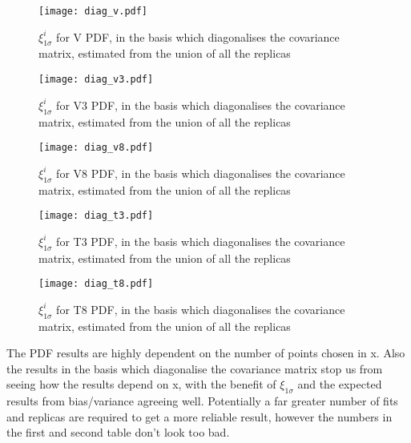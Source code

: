 \begin{figure}
    \centering
    \texttt{[image: diag\_v.pdf]}
    \caption{
        $\xi^{i}_{1\sigma}$ for V PDF, in the basis which diagonalises
        the covariance matrix, estimated from the union of all the replicas
    }
    \label{fig:pdfdiagv}
\end{figure}

\begin{figure}
    \centering
    \texttt{[image: diag\_v3.pdf]}
    \caption{
        $\xi^{i}_{1\sigma}$ for V3 PDF, in the basis which diagonalises
        the covariance matrix, estimated from the union of all the replicas
    }
    \label{fig:pdfdiagv3}
\end{figure}

\begin{figure}
    \centering
    \texttt{[image: diag\_v8.pdf]}
    \caption{
        $\xi^{i}_{1\sigma}$ for V8 PDF, in the basis which diagonalises
        the covariance matrix, estimated from the union of all the replicas
    }
    \label{fig:pdfdiagv8}
\end{figure}

\begin{figure}
    \centering
    \texttt{[image: diag\_t3.pdf]}
    \caption{
        $\xi^{i}_{1\sigma}$ for T3 PDF, in the basis which diagonalises
        the covariance matrix, estimated from the union of all the replicas
    }
    \label{fig:pdfdiagt3}
\end{figure}

\begin{figure}
    \centering
    \texttt{[image: diag\_t8.pdf]}
    \caption{
        $\xi^{i}_{1\sigma}$ for T8 PDF, in the basis which diagonalises
        the covariance matrix, estimated from the union of all the replicas
    }
    \label{fig:pdfdiagt8}
\end{figure}

The PDF results are highly dependent on the number of points chosen in x. Also
the results in the basis which diagonalise the covariance matrix stop us from
seeing how the results depend on x, with the benefit of $\xi_{1\sigma}$ and
the expected results from bias/variance agreeing well. Potentially a far greater
number of fits and replicas are required to get a more reliable result, however
the numbers in the first and second table don't look too bad.
